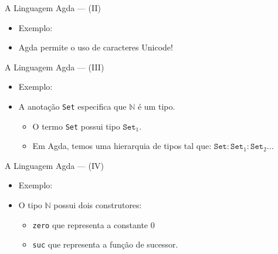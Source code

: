 \documentclass{beamer}
\begin{document}
       \begin{frame}{A Linguagem Agda --- (II)}
         \begin{itemize}
           \item Exemplo:


           \item Agda permite o uso de caracteres Unicode!
         \end{itemize}
       \end{frame}

       \begin{frame}{A Linguagem Agda --- (III)}
         \begin{itemize}
           \item Exemplo:


           \item A anota\c{c}\~ao \texttt{Set} especifica que $\mathbb{N}$ \'e um tipo.
           \begin{itemize}
             \item O termo \texttt{Set} possui tipo $\texttt{Set}_1$.
             \item Em Agda, temos uma hierarquia de tipos tal que: $\texttt{Set} : \texttt{Set}_1 : \texttt{Set}_2 ...$
           \end{itemize}
         \end{itemize}
       \end{frame}

       \begin{frame}{A Linguagem Agda --- (IV)}
         \begin{itemize}
           \item Exemplo:


           \item O tipo $\mathbb{N}$ possui dois construtores:
           \begin{itemize}
             \item \texttt{zero} que representa a constante $0$
             \item \texttt{suc} que representa a fun\c{c}\~ao de sucessor.
           \end{itemize}
         \end{itemize}
       \end{frame}       
\end{document}
